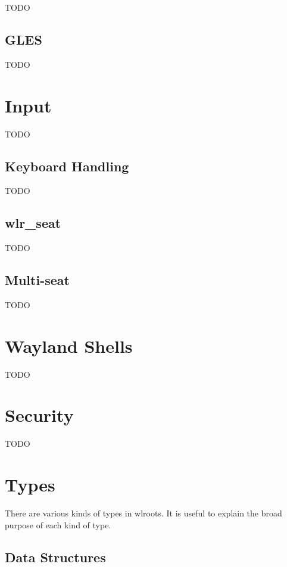 \documentclass{article}
\begin{document}
TODO

\subsection{GLES}

TODO

\newpage
\section{Input}\label{input}

TODO

\subsection{Keyboard Handling}\label{keyboard handling}

TODO

\subsection{wlr_seat}\label{wlr seat summary}

TODO

\subsection{Multi-seat}\label{multi seat}

TODO

\newpage
\section{Wayland Shells}\label{shells}

TODO

\newpage
\section{Security}\label{security}

TODO

\newpage
\section{Types}\label{types}

There are various kinds of types in wlroots. It is useful to explain the broad
purpose of each kind of type.

\subsection{Data Structures}\label{data structures}
\end{document}
